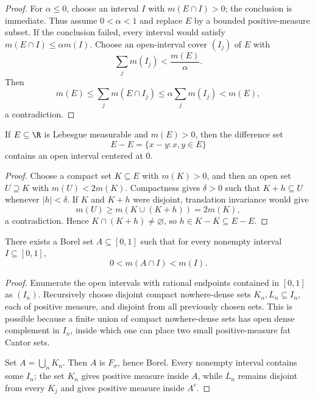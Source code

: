 \begin{proof}
For $\alpha\leq0$, choose an interval $I$ with $m(E\cap I)>0$; the conclusion is immediate. Thus assume $0<\alpha<1$ and replace $E$ by a bounded positive-measure subset. If the conclusion failed, every interval would satisfy $m(E\cap I)\leq\alpha m(I)$. Choose an open-interval cover $(I_j)$ of $E$ with
\[
\sum_jm(I_j)<\frac{m(E)}{\alpha}.
\]
Then
\[
m(E)\leq\sum_jm(E\cap I_j)
 \leq\alpha\sum_jm(I_j)<m(E),
\]
a contradiction.
\end{proof}

\begin{thm}[Steinhaus]
If $E\subseteq\R$ is Lebesgue measurable and $m(E)>0$, then the difference set
\[
E-E=\{x-y:x,y\in E\}
\]
contains an open interval centered at $0$.
\end{thm}

\begin{proof}
Choose a compact set $K\subseteq E$ with $m(K)>0$, and then an open set $U\supseteq K$ with $m(U)<2m(K)$. Compactness gives $\delta>0$ such that $K+h\subseteq U$ whenever $|h|<\delta$. If $K$ and $K+h$ were disjoint, translation invariance would give
\[
m(U)\geq m(K\cup(K+h))=2m(K),
\]
a contradiction. Hence $K\cap(K+h)\neq\varnothing$, so $h\in K-K\subseteq E-E$.
\end{proof}

\begin{prop}
There exists a Borel set $A\subseteq[0,1]$ such that for every nonempty interval $I\subseteq[0,1]$,
\[
0<m(A\cap I)<m(I).
\]
\end{prop}

\begin{proof}
Enumerate the open intervals with rational endpoints contained in $[0,1]$ as $(I_n)$. Recursively choose disjoint compact nowhere-dense sets $K_n,L_n\subseteq I_n$, each of positive measure, and disjoint from all previously chosen sets. This is possible because a finite union of compact nowhere-dense sets has open dense complement in $I_n$, inside which one can place two small positive-measure fat Cantor sets.

Set $A=\bigcup_nK_n$. Then $A$ is $F_\sigma$, hence Borel. Every nonempty interval contains some $I_n$; the set $K_n$ gives positive measure inside $A$, while $L_n$ remains disjoint from every $K_j$ and gives positive measure inside $A^c$.
\end{proof}
